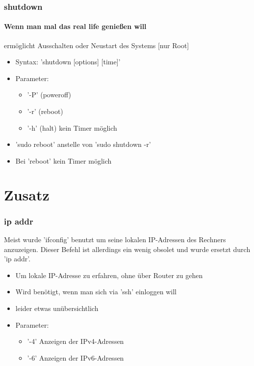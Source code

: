 \documentclass[12pt,utf8]{beamer}
\begin{document}
\begin{frame}
\frametitle{shutdown}
\framesubtitle{Wenn man mal das real life genießen will}
ermöglicht Ausschalten oder Neustart des Systems [nur Root]
\begin{itemize}[<+->]
	\item Syntax: 'shutdown [options] [time]'
	\item Parameter:
	\begin{itemize}[<+->]
		\item '-P' (poweroff)
		\item '-r' (reboot) 
		\item '-h' (halt) kein Timer möglich
	\end{itemize}
	\item 'sudo reboot' anstelle von 'sudo shutdown -r'
	\item Bei 'reboot' kein Timer möglich
\end{itemize}
\end{frame}

\section{Zusatz}
\begin{frame}
\frametitle{ip addr}
Meist wurde 'ifconfig' benutzt um seine lokalen IP-Adressen des Rechners anzuzeigen. Dieser Befehl ist allerdings ein wenig obsolet und wurde ersetzt durch 'ip addr'.
\begin{itemize}
	\item Um lokale IP-Adresse zu erfahren, ohne über Router zu gehen
	\item Wird benötigt, wenn man sich via 'ssh' einloggen will
	\item leider etwas unübersichtlich
	\item Parameter:
	\begin{itemize}
		\item '-4' Anzeigen der IPv4-Adressen
		\item '-6' Anzeigen der IPv6-Adressen
	\end{itemize}
\end{itemize}
\end{frame}
\end{document}
